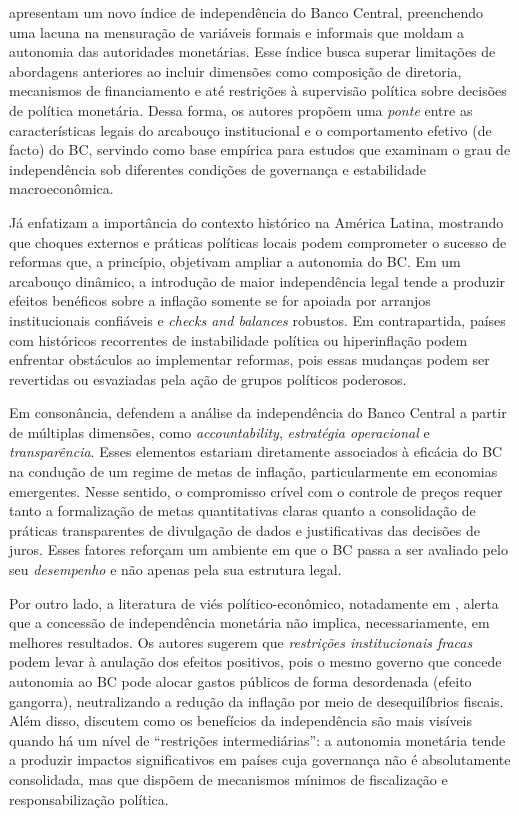 \documentclass[a4paper,12pt]{article}[abnt2]
\begin{document}
\cite{adrian2024} apresentam um novo índice de independência do Banco Central, preenchendo uma lacuna na mensuração de variáveis formais e informais que moldam a autonomia das autoridades monetárias. Esse índice busca superar limitações de abordagens anteriores ao incluir dimensões como composição de diretoria, mecanismos de financiamento e até restrições à supervisão política sobre decisões de política monetária. Dessa forma, os autores propõem uma \emph{ponte} entre as características legais do arcabouço institucional e o comportamento efetivo (de facto) do BC, servindo como base empírica para estudos que examinam o grau de independência sob diferentes condições de governança e estabilidade macroeconômica.

Já \cite{jacome2022} enfatizam a importância do contexto histórico na América Latina, mostrando que choques externos e práticas políticas locais podem comprometer o sucesso de reformas que, a princípio, objetivam ampliar a autonomia do BC. Em um arcabouço dinâmico, a introdução de maior independência legal tende a produzir efeitos benéficos sobre a inflação somente se for apoiada por arranjos institucionais confiáveis e \emph{checks and balances} robustos. Em contrapartida, países com históricos recorrentes de instabilidade política ou hiperinflação podem enfrentar obstáculos ao implementar reformas, pois essas mudanças podem ser revertidas ou esvaziadas pela ação de grupos políticos poderosos.

Em consonância, \cite{unsal2023} defendem a análise da independência do Banco Central a partir de múltiplas dimensões, como \emph{accountability}, \emph{estratégia operacional} e \emph{transparência}. Esses elementos estariam diretamente associados à eficácia do BC na condução de um regime de metas de inflação, particularmente em economias emergentes. Nesse sentido, o compromisso crível com o controle de preços requer tanto a formalização de metas quantitativas claras quanto a consolidação de práticas transparentes de divulgação de dados e justificativas das decisões de juros. Esses fatores reforçam um ambiente em que o BC passa a ser avaliado pelo seu \emph{desempenho} e não apenas pela sua estrutura legal.

Por outro lado, a literatura de viés político-econômico, notadamente em \cite{acemoglu2008}, alerta que a concessão de independência monetária não implica, necessariamente, em melhores resultados. Os autores sugerem que \emph{restrições institucionais fracas} podem levar à anulação dos efeitos positivos, pois o mesmo governo que concede autonomia ao BC pode alocar gastos públicos de forma desordenada (efeito gangorra), neutralizando a redução da inflação por meio de desequilíbrios fiscais. Além disso, \cite{acemoglu2008} discutem como os benefícios da independência são mais visíveis quando há um nível de “restrições intermediárias”: a autonomia monetária tende a produzir impactos significativos em países cuja governança não é absolutamente consolidada, mas que dispõem de mecanismos mínimos de fiscalização e responsabilização política.
\end{document}
